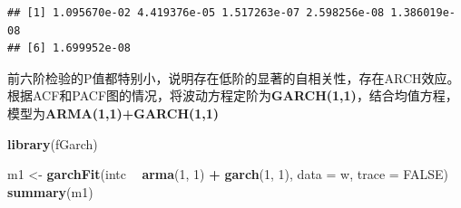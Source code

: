 \documentclass[
]{article}
\newenvironment{Shaded}{\begin{snugshade}}{\end{snugshade}}
\newcommand{\ControlFlowTok}[1]{\textcolor[rgb]{0.13,0.29,0.53}{\textbf{#1}}}
\newcommand{\DataTypeTok}[1]{\textcolor[rgb]{0.13,0.29,0.53}{#1}}
\newcommand{\DecValTok}[1]{\textcolor[rgb]{0.00,0.00,0.81}{#1}}
\newcommand{\KeywordTok}[1]{\textcolor[rgb]{0.13,0.29,0.53}{\textbf{#1}}}
\newcommand{\NormalTok}[1]{#1}
\newcommand{\OperatorTok}[1]{\textcolor[rgb]{0.81,0.36,0.00}{\textbf{#1}}}
\newcommand{\OtherTok}[1]{\textcolor[rgb]{0.56,0.35,0.01}{#1}}
\newcommand{\StringTok}[1]{\textcolor[rgb]{0.31,0.60,0.02}{#1}}
\begin{document}
\begin{Shaded}
\end{Shaded}

\begin{verbatim}
## [1] 1.095670e-02 4.419376e-05 1.517263e-07 2.598256e-08 1.386019e-08
## [6] 1.699952e-08
\end{verbatim}

前六阶检验的P值都特别小，说明存在低阶的显著的自相关性，存在ARCH效应。根据ACF和PACF图的情况，将波动方程定阶为\textbf{GARCH(1,1)}，结合均值方程，模型为\textbf{ARMA(1,1)+GARCH(1,1)}

\begin{Shaded}
\begin{Highlighting}[]
\KeywordTok{library}\NormalTok{(fGarch)}
\end{Highlighting}
\end{Shaded}

\begin{Shaded}
\begin{Highlighting}[]
\NormalTok{m1 <-}\StringTok{ }\KeywordTok{garchFit}\NormalTok{(intc }\OperatorTok{~}\StringTok{ }\KeywordTok{arma}\NormalTok{(}\DecValTok{1}\NormalTok{, }\DecValTok{1}\NormalTok{) }\OperatorTok{+}\StringTok{ }\KeywordTok{garch}\NormalTok{(}\DecValTok{1}\NormalTok{, }\DecValTok{1}\NormalTok{), }\DataTypeTok{data =}\NormalTok{ w, }\DataTypeTok{trace =} \OtherTok{FALSE}\NormalTok{)}
\KeywordTok{summary}\NormalTok{(m1)}
\end{Highlighting}
\end{Shaded}
\end{document}
